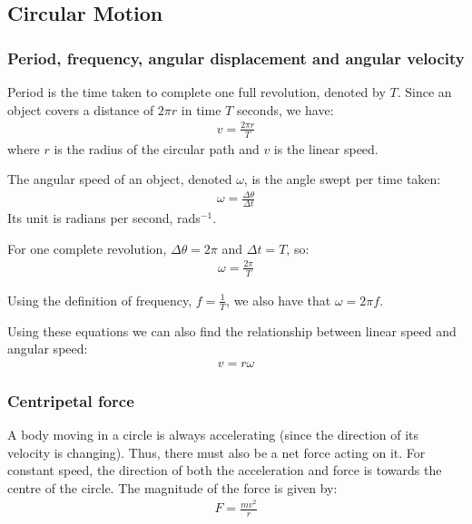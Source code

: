 \subsection{Circular Motion}

\subsubsection{Period, frequency, angular displacement and angular velocity}
\begin{definition}
    Period is the time taken to complete one full revolution, denoted by $T$.
    Since an object covers a distance of $2\pi r$ in time $T$ seconds, we have:
    \begin{align*}
        v = \frac{2 \pi r}{T}
    \end{align*}
    where $r$ is the radius of the circular path and $v$ is the linear speed.
\end{definition}

\begin{definition}
    The angular speed of an object, denoted $\omega$, is the angle swept per
    time taken:
    \begin{align*}
        \omega = \frac{\Delta \theta}{\Delta t}
    \end{align*}
    Its unit is radians per second, rads$^{-1}$.
\end{definition}

For one complete revolution, $\Delta \theta = 2\pi$ and $\Delta t = T$, so:
\begin{align*}
    \omega = \frac{2\pi}{T}
\end{align*}

Using the definition of frequency, $f = \frac{1}{T}$, we also have that
$\omega = 2\pi f$.

Using these equations we can also find the relationship between linear speed
and angular speed:
\begin{align*}
    v = r \omega
\end{align*}

\subsubsection{Centripetal force}
A body moving in a circle is always accelerating (since the direction of its
velocity is changing). Thus, there must also be a net force acting on it. For
constant speed, the direction of both the acceleration and force is towards
the centre of the circle. The magnitude of the force is given by:
\begin{align*}
    F = \frac{mv^2}{r}
\end{align*}

